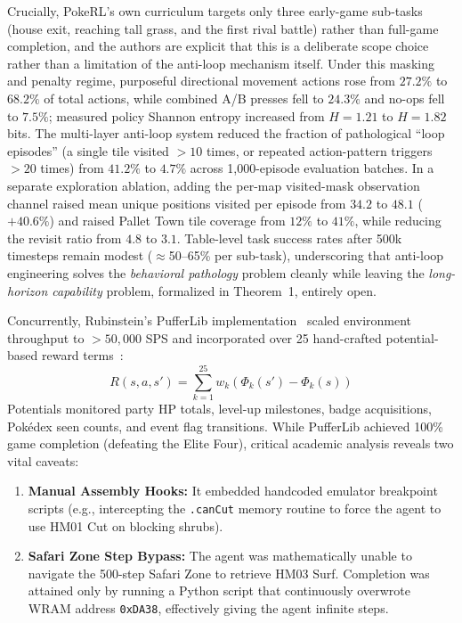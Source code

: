 \documentclass[journal,10pt,twocolumn]{IEEEtran}
\begin{document}
Crucially, PokeRL's own curriculum targets only three early-game sub-tasks (house exit, reaching tall grass, and the first rival battle) rather than full-game completion, and the authors are explicit that this is a deliberate scope choice rather than a limitation of the anti-loop mechanism itself. Under this masking and penalty regime, purposeful directional movement actions rose from $27.2\%$ to $68.2\%$ of total actions, while combined A/B presses fell to $24.3\%$ and no-ops fell to $7.5\%$; measured policy Shannon entropy increased from $H=1.21$ to $H=1.82$ bits. The multi-layer anti-loop system reduced the fraction of pathological ``loop episodes'' (a single tile visited $>10$ times, or repeated action-pattern triggers $>20$ times) from $41.2\%$ to $4.7\%$ across 1,000-episode evaluation batches. In a separate exploration ablation, adding the per-map visited-mask observation channel raised mean unique positions visited per episode from $34.2$ to $48.1$ ($+40.6\%$) and raised Pallet Town tile coverage from $12\%$ to $41\%$, while reducing the revisit ratio from $4.8$ to $3.1$. Table-level task success rates after 500k timesteps remain modest ($\approx$50--65\% per sub-task), underscoring that anti-loop engineering solves the \emph{behavioral pathology} problem cleanly while leaving the \emph{long-horizon capability} problem, formalized in Theorem~1, entirely open.

Concurrently, Rubinstein's PufferLib implementation~\cite{rubinstein2025puffer,suarez2023pufferlib} scaled environment throughput to $>50{,}000$ SPS and incorporated over 25 hand-crafted potential-based reward terms~\cite{ng1999shaping}:
\begin{equation}
R(s, a, s') = \sum_{k=1}^{25} w_k \left( \Phi_k(s') - \Phi_k(s) \right)
\end{equation}
Potentials monitored party HP totals, level-up milestones, badge acquisitions, Pok{\'e}dex seen counts, and event flag transitions. While PufferLib achieved 100\% game completion (defeating the Elite Four), critical academic analysis reveals two vital caveats:
\begin{enumerate}
    \item \textbf{Manual Assembly Hooks:} It embedded handcoded emulator breakpoint scripts (e.g., intercepting the \texttt{.canCut} memory routine to force the agent to use HM01 Cut on blocking shrubs).
    \item \textbf{Safari Zone Step Bypass:} The agent was mathematically unable to navigate the 500-step Safari Zone to retrieve HM03 Surf. Completion was attained only by running a Python script that continuously overwrote WRAM address \texttt{0xDA38}, effectively giving the agent infinite steps.
\end{enumerate}
\end{document}
